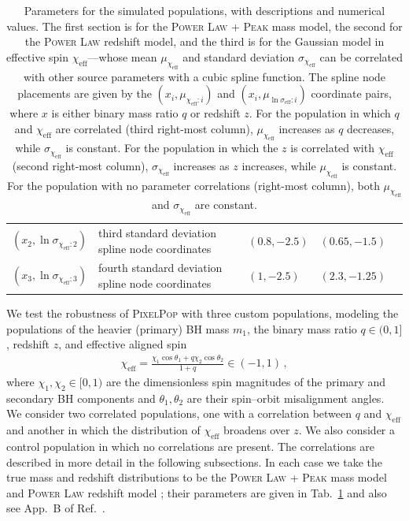 \documentclass[%
reprint,
 amsmath,amssymb,
 aps,
 prd,nofootinbib,nobibnotes,
 superscriptaddress,groupedaddress,
]{revtex4-2}
\begin{document}
\begin{table}
\begin{tabular}{lllll}
$(x_2, \ln\sigma_{\chi_\mathrm{eff}:2})$ & third standard deviation spline node coordinates & $(0.8, -2.5)$ & $(0.65, -1.5)$ &\\
$(x_3, \ln\sigma_{\chi_\mathrm{eff}:3})$ & fourth standard deviation spline node coordinates & $(1, -2.5)$ & $(2.3, -1.25)$ &\\
\hline\hline
\end{tabular}
\caption{Parameters for the simulated populations, with descriptions and numerical values. The first section is for the \textsc{Power Law + Peak} mass model, the second for the \textsc{Power Law} redshift model, and the third is for the Gaussian model in effective spin $\chi_\mathrm{eff}$---whose mean $\mu_{\chi_\mathrm{eff}}$ and standard deviation $\sigma_{\chi_\mathrm{eff}}$ can be correlated with other source parameters with a cubic spline function. The spline node placements are given by the $(x_i, \mu_{\chi_\mathrm{eff}:i})$ and $(x_i, \mu_{\ln\sigma_\mathrm{eff}:i})$ coordinate pairs, where $x$ is either binary mass ratio $q$ or redshift $z$. For the population in which $q$ and $\chi_\mathrm{eff}$ are correlated (third right-most column), $\mu_{\chi_\mathrm{eff}}$ increases as $q$ decreases, while $\sigma_{\chi_\mathrm{eff}}$ is constant. For the population in which the $z$ is correlated with $\chi_\mathrm{eff}$ (second right-most column), $\sigma_{\chi_\mathrm{eff}}$ increases as $z$ increases, while $\mu_{\chi_\mathrm{eff}}$ is constant. For the population with no parameter correlations (right-most column), both $\mu_{\chi_\mathrm{eff}}$ and $\sigma_{\chi_\mathrm{eff}}$ are constant.}
\label{tab:true_hyper}
\end{table}

We test the robustness of \textsc{PixelPop} with three custom populations, modeling the populations of the heavier (primary) BH mass $m_1$, the binary mass ratio $q\in(0,1]$, redshift $z$, and effective aligned spin \cite{Racine:2008qv}
\begin{align}
\chi_\mathrm{eff}
=
\frac{ \chi_1 \cos\theta_1 + q \chi_2 \cos\theta_2 }{ 1 + q }
\in (-1,1)
\, ,
\end{align}
where $\chi_1,\chi_2\in[0,1)$ are the dimensionless spin magnitudes of the primary and secondary BH components and $\theta_1,\theta_2$ are their spin--orbit misalignment angles. We consider two correlated populations, one with a correlation between $q$ and $\chi_\mathrm{eff}$ and another in which the distribution of $\chi_\mathrm{eff}$ broadens over $z$. We also consider a control population in which no correlations are present. The correlations are described in more detail in the following subsections. In each case we take the true mass and redshift distributions to be the \textsc{Power Law + Peak} mass model \cite{Talbot:2018cva} and \textsc{Power Law} redshift model \cite{Fishbach:2018edt}; their parameters are given in Tab.~\ref{tab:true_hyper} and also see App.~B of Ref.~\cite{KAGRA:2021duu}.
\end{document}
